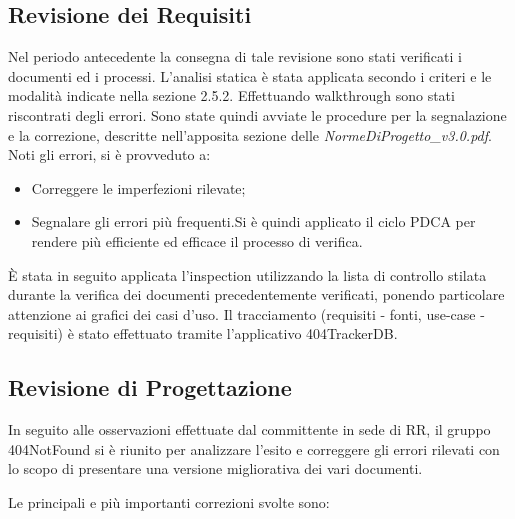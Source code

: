\subsection{Revisione dei Requisiti}
Nel periodo antecedente la consegna di tale revisione sono stati verificati i documenti ed i processi.
L'analisi statica è stata applicata secondo i criteri e le modalità indicate nella sezione 2.5.2. Effettuando walkthrough sono stati riscontrati degli errori. Sono state quindi avviate le procedure per la segnalazione e la correzione, descritte nell'apposita sezione delle \textit{NormeDiProgetto\_v3.0.pdf}.
Noti gli errori, si è provveduto a:
\begin{itemize}
	\item Correggere le imperfezioni rilevate;
	\item Segnalare gli errori più frequenti.Si è quindi applicato il ciclo PDCA per rendere più efficiente ed efficace il processo di verifica.
\end{itemize}
È stata in seguito applicata l'inspection utilizzando la lista di controllo stilata durante la verifica dei documenti precedentemente verificati, ponendo particolare attenzione ai grafici dei casi d'uso.
Il tracciamento (requisiti - fonti, use-case - requisiti) è stato effettuato tramite l'applicativo 404TrackerDB.
\newpage
\subsection{Revisione di Progettazione}
In seguito alle osservazioni effettuate dal committente in sede di RR, il gruppo 404NotFound si è riunito per analizzare l'esito e correggere gli errori rilevati con lo scopo di presentare una versione migliorativa dei vari documenti.

Le principali e più importanti correzioni svolte sono:

